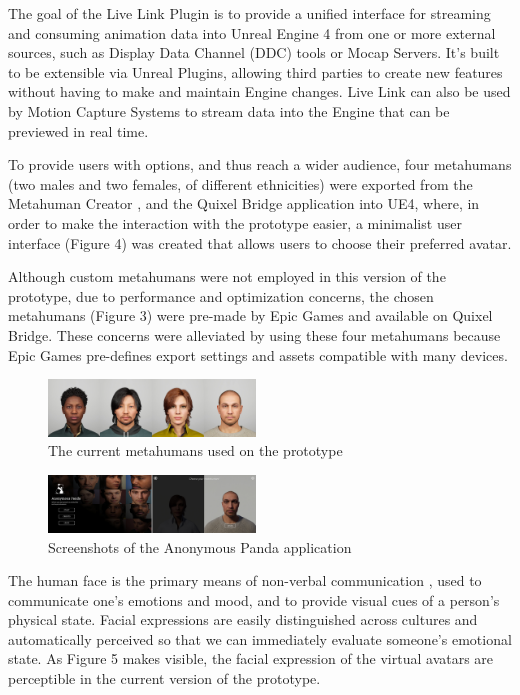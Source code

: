 The goal of the Live Link Plugin \cite{EPI22} is to provide a unified interface for streaming and consuming animation data into Unreal Engine 4 from one or more external sources, such as Display Data Channel (DDC) tools or Mocap Servers. It's built to be extensible via Unreal Plugins, allowing third parties to create new features without having to make and maintain Engine changes. Live Link can also be used by Motion Capture Systems to stream data into the Engine that can be previewed in real time.

To provide users with options, and thus reach a wider audience, four metahumans (two males and two females, of different ethnicities) were exported from the Metahuman Creator \cite{EPI21}, and the Quixel Bridge application into UE4, where, in order to make the interaction with the prototype easier, a minimalist user interface (Figure 4) was created that allows users to choose their preferred avatar. 

Although custom metahumans were not employed in this version of the prototype, due to performance and optimization concerns, the chosen metahumans (Figure 3) were pre-made by Epic Games and available on Quixel Bridge. These concerns were alleviated by using these four metahumans because Epic Games pre-defines export settings and assets compatible with many devices.

\begin{figure}[h!]
\includegraphics[width=0.49\textwidth]{figures/4metahumans.jpg}
\centering
\caption{The current metahumans used on the prototype}
\end{figure}


\begin{figure}[h!]
\includegraphics[width=0.49\textwidth]{figures/ui-app.jpg}
\centering
\caption{Screenshots of the Anonymous Panda application}
\end{figure}

The human face is the primary means of non-verbal communication \cite{MALO20, KUJ03, SAU19}, used to communicate one's emotions and mood, and to provide visual cues of a person's physical state. Facial expressions are easily distinguished across cultures and automatically perceived so that we can immediately evaluate someone's emotional state. As Figure 5 makes visible, the facial expression of the virtual avatars are perceptible in the current version of the prototype. 

